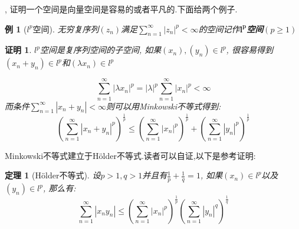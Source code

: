 \documentclass[a4paper,11pt]{article}
\theoremstyle{mystyle}
\newtheorem{theorem}{\hspace{2em}定理}[section]
\newtheorem{Proof}{\hspace{2em}证明}[section]
\newtheorem{example}{\hspace{2em}例}[section]
\begin{document}
, 证明一个空间是向量空间是容易的或者平凡的.下面给两个例子.
\begin{example}[$l^p$空间]
  无穷复序列$(z_n)$满足$\sum_{n=1}^{\infty}|z_n|^p<\infty$的空间记作\textbf{$\mathbf{l^p}$空间}$(p\geq1)$
\end{example}
\begin{Proof}
  \indent$l^p$空间是复序列空间的子空间, 如果$(x_n),(y_n)\in l^p$, 很容易得到$(x_n+y_n)\in l^p$和$(\lambda x_n)\in l^p$

  \begin{equation*}
    \sum_{n=1}^\infty|\lambda x_n|^p=|\lambda|^p\sum_{n=1}^{\infty}|x_n|^p<\infty
  \end{equation*}
而条件$\sum_{n=1}^{\infty}|x_n+y_n|<\infty$则可以用Minkowski不等式得到:
\begin{equation*}
  (\sum_{n=1}^{\infty}|x_n+y_n|^p)^{\frac{1}{p}}\leq(\sum_{n=1}^{\infty}|x_n|^p)^{\frac{1}{p}}+(\sum_{n=1}^{\infty}|y_n|^p)^{\frac{1}{p}}
\end{equation*}
\end{Proof}
Minkowski不等式建立于H\"{o}lder不等式.读者可以自证,以下是参考证明:
\begin{theorem}[H\"{o}lder不等式]
  设$p>1,q>1$并且有$\frac{1}{p}+\frac{1}{q}=1$, 如果$(x_n)\in l^p$以及$(y_n)\in l^p$, 那么有:
  \begin{equation*}
    \sum_{n=1}^{\infty}|x_ny_n|\leq(\sum_{n=1}^{\infty}|x_n|^p)^{\frac{1}{p}}(\sum_{n=1}^{\infty}|y_n|^q)^{\frac{1}{q}}
  \end{equation*}
\end{theorem}
\end{document}
